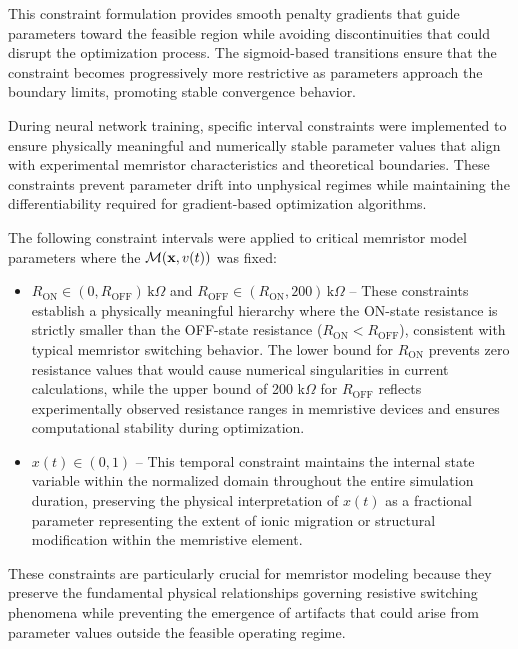 \documentclass[11pt, oneside]{article}
\newcommand{\M}{\mathcal{M}}
\begin{document}
This constraint formulation provides smooth penalty gradients that guide parameters toward the feasible region while avoiding discontinuities that could disrupt the optimization process. The sigmoid-based transitions ensure that the constraint becomes progressively more restrictive as parameters approach the boundary limits, promoting stable convergence behavior.


During neural network training, specific interval constraints were implemented to ensure physically meaningful and numerically stable parameter values that align with experimental memristor characteristics and theoretical boundaries. These constraints prevent parameter drift into unphysical regimes while maintaining the differentiability required for gradient-based optimization algorithms.

The following constraint intervals were applied to critical memristor model parameters where the $\M(\xvec, v(t))$ was fixed:

\begin{itemize}
    \item $R_{\mathrm{ON}} \in (0, R_{\mathrm{OFF}})\,\mathrm{k}\Omega$ and $R_{\mathrm{OFF}} \in (R_{\mathrm{ON}}, 200)\,\mathrm{k}\Omega$ – These constraints establish a physically meaningful hierarchy where the ON-state resistance is strictly smaller than the OFF-state resistance ($R_{\mathrm{ON}} < R_{\mathrm{OFF}}$), consistent with typical memristor switching behavior. The lower bound for $R_{\mathrm{ON}}$ prevents zero resistance values that would cause numerical singularities in current calculations, while the upper bound of 200 k$\Omega$ for $R_{\mathrm{OFF}}$ reflects experimentally observed resistance ranges in memristive devices and ensures computational stability during optimization.


    \item $x(t) \in (0, 1)$ – This temporal constraint maintains the internal state variable within the normalized domain throughout the entire simulation duration, preserving the physical interpretation of $x(t)$ as a fractional parameter representing the extent of ionic migration or structural modification within the memristive element.
\end{itemize}

These constraints are particularly crucial for memristor modeling because they preserve the fundamental physical relationships governing resistive switching phenomena while preventing the emergence of artifacts that could arise from parameter values outside the feasible operating regime.
\end{document}
